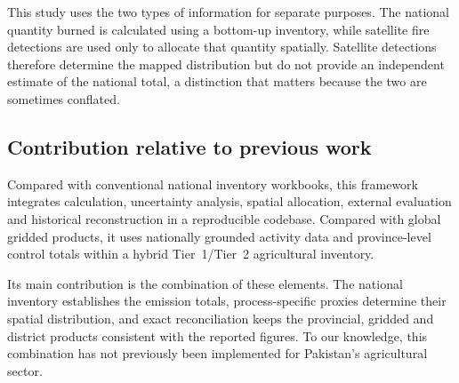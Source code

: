 This study uses the two types of information for separate purposes. The national quantity
burned is calculated using a bottom-up inventory, while satellite fire detections are used
only to allocate that quantity spatially. Satellite detections therefore determine the
mapped distribution but do not provide an independent estimate of the national total, a
distinction that matters because the two are sometimes conflated.

\subsection{Contribution relative to previous work}

Compared with conventional national inventory workbooks, this framework integrates
calculation, uncertainty analysis, spatial allocation, external evaluation and historical
reconstruction in a reproducible codebase. Compared with global gridded products, it uses
nationally grounded activity data and province-level control totals within a hybrid
Tier~1/Tier~2 agricultural inventory.

Its main contribution is the combination of these elements. The national inventory
establishes the emission totals, process-specific proxies determine their spatial
distribution, and exact reconciliation keeps the provincial, gridded and district products
consistent with the reported figures. To our knowledge, this combination has not previously
been implemented for Pakistan's agricultural sector.
